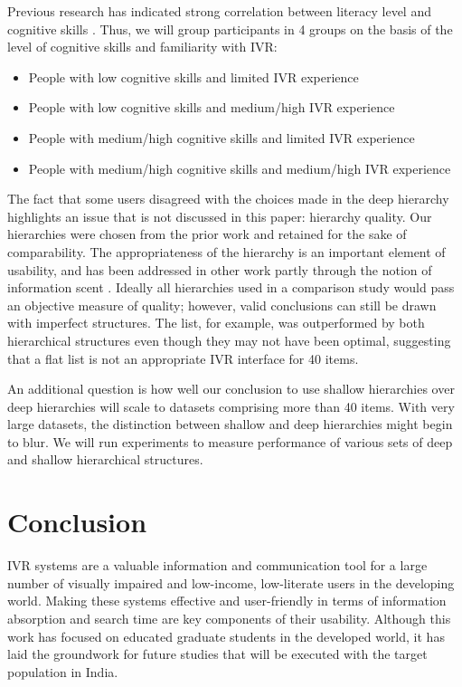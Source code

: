 \documentclass{sigchi}
\begin{document}
Previous research has indicated strong correlation between literacy level and cognitive skills \cite{Reis2001,Medhi2013a}. Thus, we will group participants in 4 groups on the basis of the level of cognitive skills and familiarity with IVR:

\begin{itemize}
\item People with low cognitive skills and limited IVR experience
\item People with low cognitive skills and medium/high IVR experience
\item People with medium/high cognitive skills and limited IVR experience
\item People with medium/high cognitive skills and medium/high IVR experience
\end{itemize}

The fact that some users disagreed with the choices made in the deep hierarchy highlights an issue that is not discussed in this paper: hierarchy quality. Our hierarchies were chosen from the prior work \cite{Medhi2013a,Medhi2013b} and retained for the sake of comparability. The appropriateness of the hierarchy is an important element of usability, and has been addressed in other work partly through the notion of information scent \cite{Pirolli2003}. Ideally all hierarchies used in a comparison study would pass an objective measure of quality; however, valid conclusions can still be drawn with imperfect structures. The list, for example, was outperformed by both hierarchical structures even though they may not have been optimal, suggesting that a flat list is not an appropriate IVR interface for 40 items.

An additional question is how well our conclusion to use shallow hierarchies over deep hierarchies will scale to datasets comprising more than 40 items. With very large datasets, the distinction between shallow and deep hierarchies might begin to blur. We will run experiments to measure performance of various sets of deep and shallow hierarchical structures.

\section{Conclusion}

IVR systems are a valuable information and communication tool for a large number of visually impaired and low-income, low-literate users in the developing world. Making these systems effective and user-friendly in terms of information absorption and search time are key components of their usability. Although this work has focused on educated graduate students in the developed world, it has laid the groundwork for future studies that will be executed with the target population in India.
\end{document}

